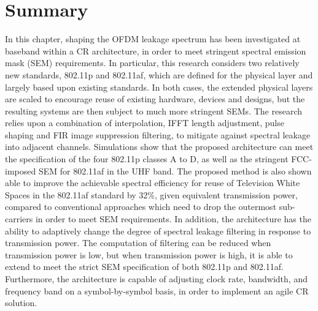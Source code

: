 \section{Summary}
In this chapter, shaping the OFDM leakage spectrum has been investigated at baseband within a CR architecture, in order to meet stringent spectral emission mask (SEM) requirements.
In particular, this research considers two relatively new standards, 802.11p and 802.11af, which are defined for the physical layer and largely based upon existing standards.
In both cases, the extended physical layers are scaled to encourage reuse of existing hardware, devices and designs, but the resulting systems are then subject to much more stringent SEMs.
The research relies upon a combination of interpolation, IFFT length adjustment, pulse shaping and FIR image suppression filtering, to mitigate against spectral leakage into adjacent channels.
Simulations show that the proposed architecture can meet the specification of the four 802.11p classes A to D, as well as the stringent FCC-imposed SEM for 802.11af in the UHF
band.
The proposed method is also shown able to improve the achievable spectral efficiency for reuse of Television White Spaces in the 802.11af standard by 32\%, given equivalent transmission power, compared to conventional approaches which need to drop the outermost sub-carriers in order to meet SEM requirements.
In addition, the architecture has the ability to adaptively change the degree of spectral leakage filtering in response to transmission power.
The computation of filtering can be reduced when transmission power is low, but when transmission power is high, it is able to extend to meet the strict SEM specification of both 802.11p and 802.11af.
Furthermore, the architecture is capable of adjusting clock rate, bandwidth, and frequency band on a symbol-by-symbol basis, in order to implement an agile CR solution.
